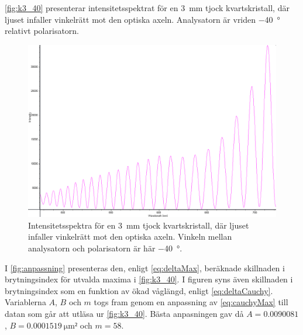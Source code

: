 \documentclass[a4paper]{article}
\begin{document}
\autoref{fig:k3_40} presenterar intensitetsspektrat för en \SI{3}{\milli\m} tjock kvartskristall, där ljuset infaller vinkelrätt mot den optiska axeln. Analysatorn är vriden \SI{-40}{\degree} relativt polarisatorn.

\FloatBarrier
\begin{figure}[ht!]
	\centering
	\includegraphics[width=\linewidth]{data/spektra_180_kristall3_140_inv}
	\caption{Intensitetsspektra för en \SI{3}{\milli\m} tjock kvartskristall, där ljuset infaller vinkelrätt mot den optiska axeln. Vinkeln mellan analysatorn och polarisatorn är här \SI{-40}{\degree}.}
	\label{fig:k3_40}
\end{figure}
\FloatBarrier

I \autoref{fig:anpassning} presenteras den, enligt \eqref{eq:deltaMax}, beräknade skillnaden i brytningsindex för utvalda maxima i \autoref{fig:k3_40}. I figuren syns även skillnaden i brytningsindex som en funktion av ökad våglängd, enligt \eqref{eq:deltaCauchy}. Variablerna $A$, $B$ och $m$ togs fram genom en anpassning av \eqref{eq:cauchyMax} till datan som går att utläsa ur \autoref{fig:k3_40}. Bästa anpasningen gav då $A = 0.0090081$, $B = \SI{0.0001519}{\micro\m²}$ och $m = 58$.

\FloatBarrier

\end{document}
